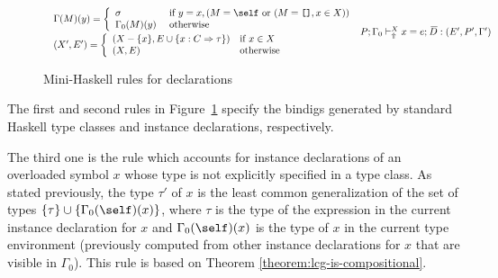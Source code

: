 \begin{figure}
\begin{mdframed}
\[\begin{array}{cc}
{\begin{array}{l}
           \Gamma(M)(y) = \left\{ \begin{array}{ll}
                                    \sigma & \text{ if } y = x, (M = \self \text{ or }
                                                                 (M = \texttt{[]}, x \in X)) \\
                                      \Gamma_0(M)(y) & \text{ otherwise } 
                                   \end{array}\right.\\[.3cm]                   
           (X',E') = \left\{ \begin{array}{ll}
                               (X - \{ x \}, E \cup \{x : C\Rightarrow\tau\}) 
                                   & \text{if } x \in X\\
                               (X, E) & \text{otherwise} 
                             \end{array}\right. 
          \end{array}}
	 {P;\Gamma_0 \vdash_{\Uparrow}^X x = e;\: \overline{\!D} : (E',P',\Gamma')} 
\end{array} \]
\end{mdframed} \vspace{-.2cm}
\caption{Mini-Haskell rules for declarations}
\label{fig:mini-haskell-rules-for-declarations}
\end{figure}

The first and second rules in
Figure~\ref{fig:mini-haskell-rules-for-declarations} specify the
bindigs generated by standard Haskell type classes and instance
declarations, respectively.

The third one is the rule which accounts for instance declarations of
an overloaded symbol $x$ whose type is not explicitly specified in a
type class. As stated previously, the type $\tau'$ of $x$ is the least
common generalization of the set of types $\{\tau\} \cup
\{\Gamma_0(\self)(x)\}$, where $\tau$ is the type of the expression in
the current instance declaration for $x$ and $\Gamma_0(\self)(x)$ is
the type of $x$ in the current type environment (previously computed
from other instance declarations for $x$ that are visible in
$\Gamma_0$). This rule is based on Theorem
\ref{theorem:lcg-is-compositional}.
